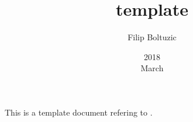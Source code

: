 \documentclass[a4paper,10pt]{article}
\title{template}
\author{Filip Boltuzic}
\date{2018 \\ March}
\begin{document}
\maketitle

This is a template document refering to \cite{boltuvzic2015identifying}.



\end{document}
